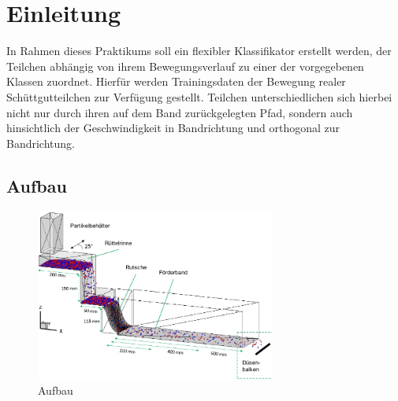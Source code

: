 \section{Einleitung}
In Rahmen dieses Praktikums soll ein flexibler Klassifikator erstellt werden, der Teilchen abhängig von ihrem Bewegungsverlauf zu einer der vorgegebenen Klassen zuordnet. Hierfür werden Trainingsdaten der Bewegung realer Schüttgutteilchen zur Verfügung gestellt. Teilchen unterschiedlichen sich hierbei nicht nur durch ihren auf dem Band zurückgelegten Pfad, sondern auch hinsichtlich der Geschwindigkeit in Bandrichtung und orthogonal zur Bandrichtung.

\subsection{Aufbau}

\begin{figure}[!h]
    \centering
    \includegraphics[width=0.7\textwidth]{pics/aufbau.pdf}
    \caption{Aufbau \cite{ITM07_BrunnSawo}}
    \label{fig:Aufbau}
\end{figure}